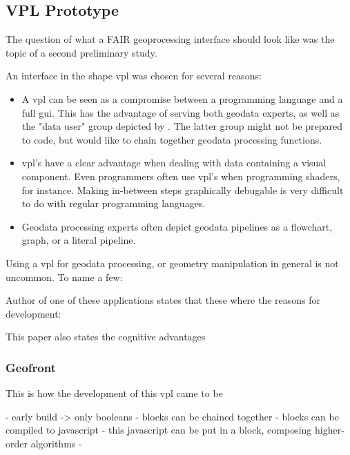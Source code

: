 \subsection*{VPL Prototype}

The question of what a FAIR geoprocessing interface should look like was the topic of a second preliminary study. 


An interface in the shape \ac{vpl} was chosen for several reasons:

\begin{itemize}
  \item A \ac{vpl} can be seen as a compromise between a programming language and a full \ac{gui}. This has the advantage of serving both geodata experts, as well as the "data user" group depicted by \cite{brink_geospatial_2018}. The latter group might not be prepared to code, but would like to chain together geodata processing functions.
  \item \ac{vpl}'s have a clear advantage when dealing with data containing a visual component. Even programmers often use \ac{vpl}'s when programming shaders, for instance. Making in-between steps graphically debugable is very difficult to do with regular programming languages.  
  \item Geodata processing experts often depict geodata pipelines as a flowchart, graph, or a literal pipeline. 
\end{itemize}

Using a \ac{vpl} for geodata processing, or geometry manipulation in general is not uncommon. To name a few: 



Author of one of these applications states that these where the reasons for development: 

This paper also states the cognitive advantages 




\subsubsection*{Geofront}

This is how the development of this \ac{vpl} came to be

- early build -> only booleans
- blocks can be chained together
- blocks can be compiled to javascript
- this javascript can be put in a block, composing higher-order algorithms
- 